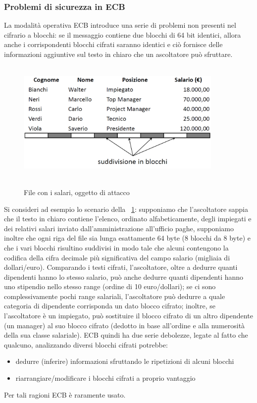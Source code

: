 \subsubsection{Problemi di sicurezza in ECB}
La modalità operativa ECB introduce una serie di problemi non presenti nel cifrario a blocchi: se il messaggio contiene due blocchi di 64 bit identici, allora anche i corrispondenti blocchi cifrati saranno identici e ciò fornisce delle informazioni aggiuntive sul testo in chiaro che un ascoltatore può sfruttare.
\begin{figure}
\centering%
	\subfigure%
	{\includegraphics[height=6cm, width=10cm, keepaspectratio]{Immagini/Capitolo3/File_salari.png}}
	\caption{File con i salari, oggetto di attacco \label{fig:File_salari}} 	
\end{figure}
Si consideri ad esempio lo scenario della \figurename ~\ref{fig:File_salari}: supponiamo che l'ascoltatore sappia che il testo in chiaro contiene l'elenco, ordinato alfabeticamente, degli impiegati e dei relativi salari inviato dall'amministrazione all'ufficio paghe, supponiamo inoltre che ogni riga del file sia lunga esattamente 64 byte (8 blocchi da 8 byte) e che i vari blocchi risultino suddivisi in modo tale che alcuni contengono la codifica della cifra decimale più significativa del campo salario (migliaia di dollari/euro). Comparando i testi cifrati, l'ascoltatore, oltre a dedurre quanti dipendenti hanno lo stesso salario, può anche dedurre quanti dipendenti hanno uno stipendio nello stesso range (ordine di 10 euro/dollari); se ci sono complessivamente pochi range salariali, l'ascoltatore può dedurre a quale categoria di dipendente corrisponda un dato blocco cifrato; inoltre, se l'ascoltatore è un impiegato, può sostituire il blocco cifrato di un altro dipendente (un manager) al suo blocco cifrato (dedotto in base all'ordine e alla
numerosità della sua classe salariale).\newline \newline
ECB quindi ha due serie debolezze, legate al fatto che qualcuno, analizzando diversi blocchi cifrati potrebbe:
\begin{itemize}
\item dedurre (inferire) informazioni sfruttando le ripetizioni di alcuni blocchi
\item riarrangiare/modificare i blocchi cifrati a proprio vantaggio
\end{itemize}
Per tali ragioni ECB è raramente usato.

